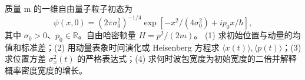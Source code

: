 质量 m 的一维自由量子粒子初态为
\[
\psi(x,0)=(2\pi\sigma_0^2)^{-1/4}
\exp[-x^2/(4\sigma_0^2)+ip_0x/\hbar],
\]
其中 \(\sigma_0>0\)、\(p_0\in\mathbb R\)。自由哈密顿量 \(H=p^2/(2m)\)。
(1) 求初始位置与动量的均值和标准差；(2) 用动量表象时间演化或 Heisenberg 方程求 \(\langle x(t)\rangle,\langle p(t)\rangle\)；(3) 求位置方差 \(\sigma_x^2(t)\) 的严格表达式；(4) 求何时波包宽度为初始宽度的二倍并解释概率密度宽度的增长。
